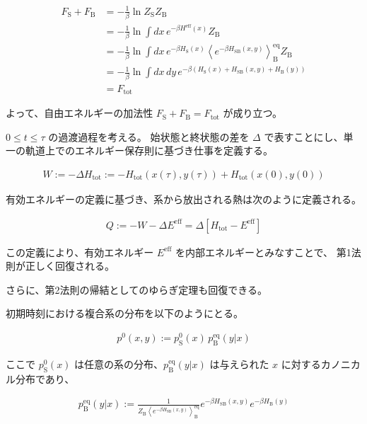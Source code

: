 \documentclass[a4paper,11pt]{jsarticle}
\numberwithin{equation}{section}
\begin{document}
\begin{align}
F_{\text{S}} + F_{\text{B}} &= -\frac{1}{\beta} \ln Z_{\text{S}} Z_{\text{B}} \\
&= -\frac{1}{\beta} \ln \int dx\, e^{-\beta H^{\mathrm{eff}}(x)} Z_{\text{B}} \\
&= -\frac{1}{\beta} \ln \int dx\, e^{-\beta H_{\text{S}}(x)} \left\langle e^{-\beta H_{\text{SB}}(x,y)} \right\rangle_{\text{B}}^{\mathrm{eq}} Z_{\text{B}} \\
&= -\frac{1}{\beta} \ln \int dx\, dy\, e^{-\beta (H_{\text{S}}(x) + H_{\text{SB}}(x,y) + H_{\text{B}}(y))} \\
&= F_{\text{tot}}
\end{align}

よって、自由エネルギーの加法性 $F_{\text{S}} + F_{\text{B}} = F_{\text{tot}}$ が成り立つ。

$0 \leq t \leq \tau$ の過渡過程を考える。  
始状態と終状態の差を $\Delta$ で表すことにし、単一の軌道上でのエネルギー保存則に基づき仕事を定義する。

\begin{align}
W := -\Delta H_{\text{tot}} := -H_{\text{tot}}(x(\tau), y(\tau)) + H_{\text{tot}}(x(0), y(0))
\end{align}

有効エネルギーの定義に基づき、系から放出される熱は次のように定義される。

\begin{align}
Q := -W - \Delta E^{\mathrm{eff}} = \Delta [H_{\text{tot}} - E^{\mathrm{eff}}]
\end{align}

この定義により、有効エネルギー $E^{\mathrm{eff}}$ を内部エネルギーとみなすことで、
第1法則が正しく回復される。

さらに、第2法則の帰結としてのゆらぎ定理も回復できる。

初期時刻における複合系の分布を以下のようにとる。

\begin{align}
p^0(x, y) := p_{\text{S}}^0(x)\, p_{\text{B}}^{\mathrm{eq}}(y | x)
\end{align}

ここで $p_{\text{S}}^0(x)$ は任意の系の分布、$p_{\text{B}}^{\mathrm{eq}}(y | x)$ は与えられた $x$ に対するカノニカル分布であり、

\begin{align}
p_{\text{B}}^{\mathrm{eq}}(y | x) := \frac{1}{Z_{\text{B}} \left\langle e^{-\beta H_{\text{SB}}(x,y)} \right\rangle_{\text{B}}^{\mathrm{eq}}} e^{-\beta H_{\text{SB}}(x,y)} e^{-\beta H_{\text{B}}(y)}
\end{align}
\end{document}
